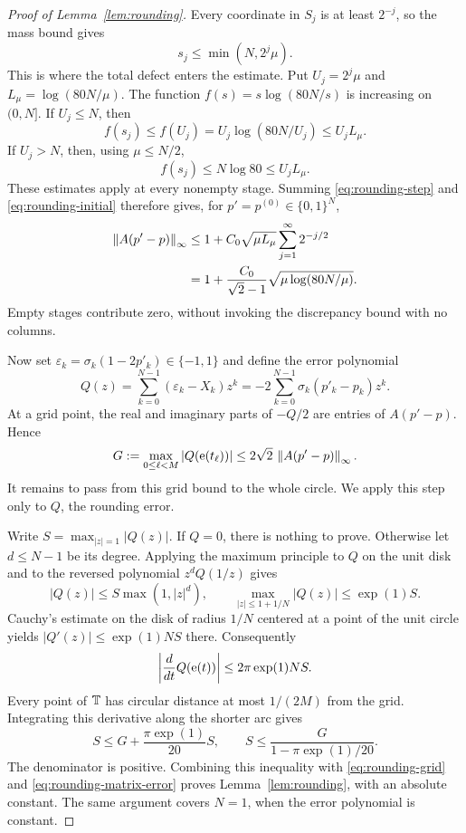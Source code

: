 \begin{proof}[Proof of Lemma~\ref{lem:rounding}]
Every coordinate in $S_j$ is at least $2^{-j}$, so the mass bound gives
\[
 s_j\le\min(N,2^j\mu).
\]
This is where the total defect enters the estimate.  Put
$U_j=2^j\mu$ and $L_\mu=\log(80N/\mu)$.  The function
$f(s)=s\log(80N/s)$ is increasing on $(0,N]$.  If $U_j\le N$, then
\[
 f(s_j)\le f(U_j)
 =U_j\log(80N/U_j)\le U_jL_\mu.
\]
If $U_j>N$, then, using $\mu\le N/2$,
\[
 f(s_j)\le N\log80\le U_jL_\mu.
\]
These estimates apply at every nonempty stage.  Summing
\eqref{eq:rounding-step} and \eqref{eq:rounding-initial} therefore gives,
for $p'=p^{(0)}\in\{0,1\}^N$,
\begin{equation}\label{eq:rounding-matrix-error}
 \begin{aligned}
 \left\lVert A(p'-p)\right\rVert_\infty
 &\le1+C_0\sqrt{\mu L_\mu}\sum_{j=1}^{\infty}2^{-j/2}\\
 &=1+\frac{C_0}{\sqrt2-1}\sqrt{\mu\log(80N/\mu)}.
 \end{aligned}
\end{equation}
Empty stages contribute zero, without invoking the discrepancy bound
with no columns.

Now set $\varepsilon_k=\sigma_k(1-2p'_k)\in\{-1,1\}$ and define the
error polynomial
\[
 Q(z)=\sum_{k=0}^{N-1}(\varepsilon_k-X_k)z^k
     =-2\sum_{k=0}^{N-1}\sigma_k(p'_k-p_k)z^k.
\]
At a grid point, the real and imaginary parts of $-Q/2$ are
entries of $A(p'-p)$.  Hence
\begin{equation}\label{eq:rounding-grid}
 G:=\max_{0\le\ell<M}|Q(\mathrm e(t_\ell))|
 \le2\sqrt2\,\left\lVert A(p'-p)\right\rVert_\infty.
\end{equation}
It remains to pass from this grid bound to the whole circle.  We apply
this step only to $Q$, the rounding error.

Write $S=\max_{|z|=1}|Q(z)|$.  If $Q=0$, there is nothing to prove.
Otherwise let $d\le N-1$ be its degree.  Applying the maximum principle
to $Q$ on the unit disk and to the reversed polynomial $z^dQ(1/z)$ gives
\[
 |Q(z)|\le S\max(1,|z|^d),
 \qquad
 \max_{|z|\le1+1/N}|Q(z)|\le \exp(1)S.
\]
Cauchy's estimate on the disk of radius $1/N$ centered at a point of
the unit circle yields $|Q'(z)|\le\exp(1)NS$ there.  Consequently
\[
 \left|\frac{d}{dt}Q(\mathrm e(t))\right|
 \le2\pi\exp(1)NS.
\]
Every point of $\mathbb T$ has circular distance at most $1/(2M)$ from the
grid.  Integrating this derivative along the shorter arc gives
\[
 S\le G+\frac{\pi\exp(1)}{20}S,
 \qquad
 S\le\frac{G}{1-\pi\exp(1)/20}.
\]
The denominator is positive.  Combining this inequality with
\eqref{eq:rounding-grid} and \eqref{eq:rounding-matrix-error} proves
Lemma~\ref{lem:rounding}, with an absolute constant.  The same argument
covers $N=1$, when the error polynomial is constant.
\end{proof}
